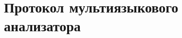 \chapter{Протокол мультиязыкового анализатора}
\label{cha:appendix1}

\inputminted[linenos=true, breaklines]{ts}{inc/src/protocol.ts}

